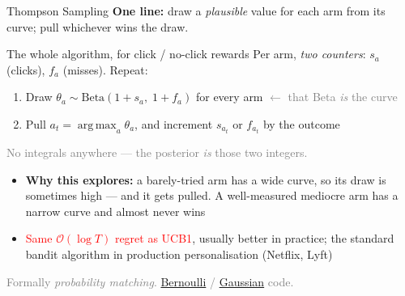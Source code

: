 \begin{frame}{Thompson Sampling}
\textbf{One line:} draw a \emph{plausible} value for each arm from its curve; pull whichever wins the draw.
\vspace{-0.2em}
\begin{block}{The whole algorithm, for click / no-click rewards}
\vspace{-0.2em}
Per arm, \emph{two counters}: $s_a$ (clicks), $f_a$ (misses). Repeat:
\begin{enumerate}
    \item Draw $\theta_a \sim \mathrm{Beta}(1+s_a,\; 1+f_a)$ for every arm \hfill \textcolor{gray}{$\leftarrow$ that Beta \emph{is} the curve}
    \item Pull $a_t = \operatorname*{arg\,max}_a \theta_a$, and increment $s_{a_t}$ or $f_{a_t}$ by the outcome
\end{enumerate}
\vspace{-0.1em}
{\footnotesize\textcolor{gray}{No integrals anywhere --- the posterior \emph{is} those two integers.}}
\end{block}
\begin{itemize}
    \setlength{\itemsep}{0.3em}
    \item \textbf{Why this explores:} a barely-tried arm has a wide curve, so its draw is sometimes high --- and it gets pulled. A well-measured mediocre arm has a narrow curve and almost never wins
    \item \textcolor{red}{Same $\mathcal{O}(\log T)$ regret as UCB1}, usually better in practice; the standard bandit algorithm in production personalisation (Netflix, Lyft)
\end{itemize}
\centering\small\textcolor{gray}{Formally \emph{probability matching}. \href{https://github.com/TikhonJelvis/RL-book/tree/master/rl/chapter14/ts_bernoulli.py}{Bernoulli} / \href{https://github.com/TikhonJelvis/RL-book/tree/master/rl/chapter14/ts_gaussian.py}{Gaussian} code.}
\end{frame}

